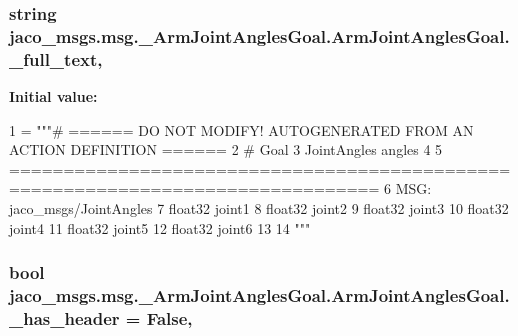 \subsubsection[{\texorpdfstring{\+\_\+full\+\_\+text}{_full_text}}]{\setlength{\rightskip}{0pt plus 5cm}string jaco\+\_\+msgs.\+msg.\+\_\+\+Arm\+Joint\+Angles\+Goal.\+Arm\+Joint\+Angles\+Goal.\+\_\+full\+\_\+text\hspace{0.3cm}{\ttfamily [static]}, {\ttfamily [private]}}\hypertarget{classjaco__msgs_1_1msg_1_1__ArmJointAnglesGoal_1_1ArmJointAnglesGoal_a68bf6039ae90de6ae75801de4e62f09c}{}\label{classjaco__msgs_1_1msg_1_1__ArmJointAnglesGoal_1_1ArmJointAnglesGoal_a68bf6039ae90de6ae75801de4e62f09c}
{\bfseries Initial value\+:}
\begin{DoxyCode}
1 = \textcolor{stringliteral}{"""# ====== DO NOT MODIFY! AUTOGENERATED FROM AN ACTION DEFINITION ======}
2 \textcolor{stringliteral}{# Goal}
3 \textcolor{stringliteral}{JointAngles angles}
4 \textcolor{stringliteral}{}
5 \textcolor{stringliteral}{================================================================================}
6 \textcolor{stringliteral}{MSG: jaco\_msgs/JointAngles}
7 \textcolor{stringliteral}{float32 joint1}
8 \textcolor{stringliteral}{float32 joint2}
9 \textcolor{stringliteral}{float32 joint3}
10 \textcolor{stringliteral}{float32 joint4}
11 \textcolor{stringliteral}{float32 joint5}
12 \textcolor{stringliteral}{float32 joint6}
13 \textcolor{stringliteral}{}
14 \textcolor{stringliteral}{"""}
\end{DoxyCode}
\subsubsection[{\texorpdfstring{\+\_\+has\+\_\+header}{_has_header}}]{\setlength{\rightskip}{0pt plus 5cm}bool jaco\+\_\+msgs.\+msg.\+\_\+\+Arm\+Joint\+Angles\+Goal.\+Arm\+Joint\+Angles\+Goal.\+\_\+has\+\_\+header = False\hspace{0.3cm}{\ttfamily [static]}, {\ttfamily [private]}}\hypertarget{classjaco__msgs_1_1msg_1_1__ArmJointAnglesGoal_1_1ArmJointAnglesGoal_ae685981df0cf1133e524c1655a9de395}{}\label{classjaco__msgs_1_1msg_1_1__ArmJointAnglesGoal_1_1ArmJointAnglesGoal_ae685981df0cf1133e524c1655a9de395}
